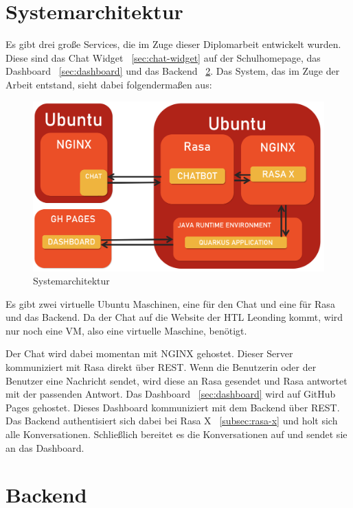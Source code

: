 \section{Systemarchitektur}\label{sec:systemarchitektur}

Es gibt drei große Services, die im Zuge dieser Diplomarbeit entwickelt wurden.
Diese sind das Chat Widget ~\ref{sec:chat-widget} auf der Schulhomepage, das Dashboard ~\ref{sec:dashboard} und das Backend ~\ref{sec:backend}.
Das System, das im Zuge der Arbeit entstand, sieht dabei folgendermaßen aus:

\begin{figure}[hbt!]
    \centering
    \includegraphics[scale=0.2]{pics/systemarchitektur}
    \caption{Systemarchitektur}
    \label{fig:impl:architektur}
\end{figure}

Es gibt zwei virtuelle Ubuntu Maschinen, eine für den Chat und eine für Rasa und das Backend.
Da der Chat auf die Website der HTL Leonding kommt, wird nur noch eine VM, also eine virtuelle Maschine, benötigt.

Der Chat wird dabei momentan mit NGINX gehostet.
Dieser Server kommuniziert mit Rasa direkt über REST.
Wenn die Benutzerin oder der Benutzer eine Nachricht sendet, wird diese an Rasa gesendet und Rasa antwortet mit der passenden Antwort.
Das Dashboard ~\ref{sec:dashboard} wird auf GitHub Pages gehostet.
Dieses Dashboard kommuniziert mit dem Backend über REST.
Das Backend authentisiert sich dabei bei Rasa X ~\ref{subsec:rasa-x} und holt sich alle Konversationen.
Schließlich bereitet es die Konversationen auf und sendet sie an das Dashboard.

\section{Backend}\label{sec:backend}

